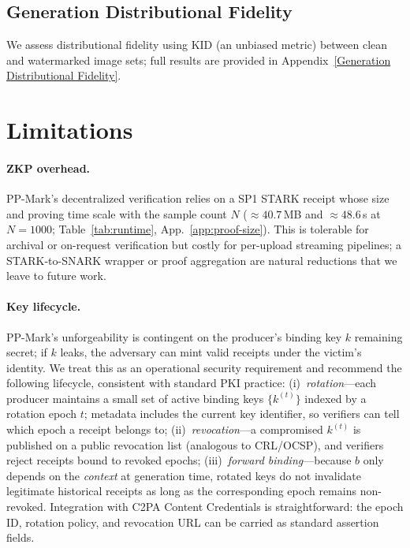 \documentclass{article}
\theoremstyle{plain}
\theoremstyle{definition}
\theoremstyle{remark}
\begin{document}
\subsection{Generation Distributional Fidelity}
We assess distributional fidelity using KID (an unbiased metric) between clean and watermarked image sets; full results are provided in Appendix~\ref{Generation Distributional Fidelity}.

\section{Limitations}\label{sec:limitations}
\paragraph{ZKP overhead.} PP-Mark's decentralized verification relies on a SP1 STARK receipt whose size and proving time scale with the sample count $N$ (${\approx}40.7$\,MB and ${\approx}48.6$\,s at $N{=}1000$; Table~\ref{tab:runtime}, App.~\ref{app:proof-size}). This is tolerable for archival or on-request verification but costly for per-upload streaming pipelines; a STARK-to-SNARK wrapper or proof aggregation are natural reductions that we leave to future work.

\paragraph{Key lifecycle.} PP-Mark's unforgeability is contingent on the producer's binding key $k$ remaining secret; if $k$ leaks, the adversary can mint valid receipts under the victim's identity. We treat this as an operational security requirement and recommend the following lifecycle, consistent with standard PKI practice: (i)~\emph{rotation}---each producer maintains a small set of active binding keys $\{k^{(t)}\}$ indexed by a rotation epoch $t$; metadata includes the current key identifier, so verifiers can tell which epoch a receipt belongs to; (ii)~\emph{revocation}---a compromised $k^{(t)}$ is published on a public revocation list (analogous to CRL/OCSP), and verifiers reject receipts bound to revoked epochs; (iii)~\emph{forward binding}---because $b$ only depends on the \emph{context} at generation time, rotated keys do not invalidate legitimate historical receipts as long as the corresponding epoch remains non-revoked. Integration with C2PA Content Credentials is straightforward: the epoch ID, rotation policy, and revocation URL can be carried as standard assertion fields.
\end{document}
